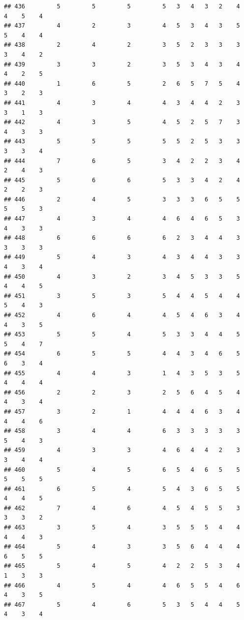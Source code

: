 \documentclass[
]{article}
\begin{document}
\begin{verbatim}
## 436         5         5         5         5   3   4   3   2    4    4    5    4
## 437         4         2         3         4   5   3   4   3    5    5    4    4
## 438         2         4         2         3   5   2   3   3    3    3    4    2
## 439         3         3         2         3   5   3   4   3    4    4    2    5
## 440         1         6         5         2   6   5   7   5    4    3    2    3
## 441         4         3         4         4   3   4   4   2    3    3    1    3
## 442         4         3         5         4   5   2   5   7    3    4    3    3
## 443         5         5         5         5   5   2   5   3    3    3    3    4
## 444         7         6         5         3   4   2   2   3    4    2    4    3
## 445         5         6         6         5   3   3   4   2    4    2    2    3
## 446         2         4         5         3   3   3   6   5    5    5    5    3
## 447         4         3         4         4   6   4   6   5    3    4    3    3
## 448         6         6         6         6   2   3   4   4    3    3    3    3
## 449         5         4         3         4   3   4   4   3    3    4    3    4
## 450         4         3         2         3   4   5   3   3    5    4    4    5
## 451         3         5         3         5   4   4   5   4    4    5    4    3
## 452         4         6         4         4   5   4   6   3    4    4    3    5
## 453         5         5         4         5   3   3   4   4    5    5    4    7
## 454         6         5         5         4   4   3   4   6    5    6    3    4
## 455         4         4         3         1   4   3   5   3    5    4    4    4
## 456         2         2         3         2   5   6   4   5    4    4    3    4
## 457         3         2         1         4   4   4   6   3    4    4    4    6
## 458         3         4         4         6   3   3   3   3    3    5    4    3
## 459         4         3         3         4   6   4   4   2    3    3    4    4
## 460         5         4         5         6   5   4   6   5    5    5    5    5
## 461         6         5         4         5   4   3   6   5    5    4    4    5
## 462         7         4         6         4   5   4   5   5    3    3    3    2
## 463         3         5         4         3   5   5   5   4    4    4    4    3
## 464         5         4         3         3   5   6   4   4    4    6    5    5
## 465         5         4         5         4   2   2   5   3    4    1    3    3
## 466         4         5         4         4   6   5   5   4    6    4    3    5
## 467         5         4         6         5   3   5   4   4    5    4    3    4

\end{verbatim}
\end{document}
